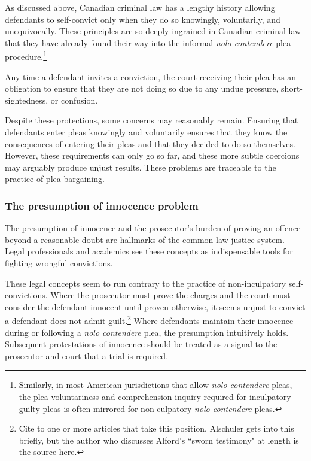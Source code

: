 As discussed above, Canadian criminal law has a lengthy history allowing defendants to self-convict only when they do so knowingly, voluntarily, and unequivocally. These principles are so deeply ingrained in Canadian criminal law that they have already found their way into the informal \textit{nolo contendere} plea procedure.\footnote{Similarly, in most American jurisdictions that allow \textit{nolo contendere} pleas, the plea voluntariness and comprehension inquiry required for inculpatory guilty pleas is often mirrored for non-culpatory \textit{nolo contendere} pleas.} 

Any time a defendant invites a conviction, the court receiving their plea has an obligation to ensure that they are not doing so due to any undue pressure, short-sightedness, or confusion.

Despite these protections, some concerns may reasonably remain. Ensuring that defendants enter pleas knowingly and voluntarily ensures that they know the consequences of entering their pleas and that they decided to do so themselves. However, these requirements can only go so far, and these more subtle coercions may arguably produce unjust results. These problems are traceable to the practice of plea bargaining.

\subsubsection{The presumption of innocence problem}

The presumption of innocence and the prosecutor's burden of proving an offence beyond a reasonable doubt are hallmarks of the common law justice system. Legal professionals and academics see these concepts as indispensable tools for fighting wrongful convictions.

These legal concepts seem to run contrary to the practice of non-inculpatory self-convictions. Where the prosecutor must prove the charges and the court must consider the defendant innocent until proven otherwise, it seems unjust to convict a defendant does not admit guilt.\footnote{Cite to one or more articles that take this position. Alschuler gets into this briefly, but the author who discusses Alford's ``sworn testimony" at length is the source here.} Where defendants maintain their innocence during or following a \textit{nolo contendere} plea, the presumption intuitively holds. Subsequent protestations of innocence should be treated as a signal to the prosecutor and court that a trial is required.

